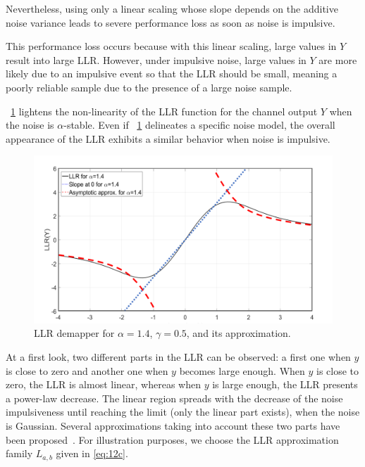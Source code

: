 \documentclass[a4paper]{IEEEtran}
\begin{document}
Nevertheless, using only a linear scaling whose slope
depends on the additive noise variance leads to severe
performance loss as soon as noise is impulsive.

This performance loss occurs because with this linear
scaling, large values in $Y$ result into large LLR.\@
However, under impulsive noise, large values in $Y$ are more
likely due to an impulsive event so that the LLR should be
small, meaning a poorly reliable sample due to the presence
of a large noise sample.

\figurename~\ref{fig:3} lightens the non-linearity of the
LLR function for the channel output $Y$ when the noise is
$\alpha$-stable. Even if \figurename~\ref{fig:3} delineates
a specific noise model, the overall appearance of the LLR
exhibits a similar behavior when noise is impulsive.

\begin{figure}
  \centering \includegraphics[width=\linewidth]{fig-3}
  \caption{LLR demapper for $\alpha=1.4$, $\gamma=0.5$, and
    its approximation.}
  \label{fig:3}
\end{figure}

At a first look, two different parts in the LLR can be
observed: a first one when $y$ is close to zero and another
one when $y$ becomes large enough. When $y$ is close to
zero, the LLR is almost linear, whereas when $y$ is large
enough, the LLR presents a power-law decrease. The linear
region spreads with the decrease of the noise impulsiveness
until reaching the limit (only the linear part exists), when
the noise is Gaussian. Several approximations taking into
account these two parts have been proposed~\cite{VALG-2014,
  SJD-1994, HALG-2013, SME-2012}. For illustration purposes,
we choose the LLR approximation family $L_{a,b}$ given in
\eqref{eq:12c}.
\end{document}
